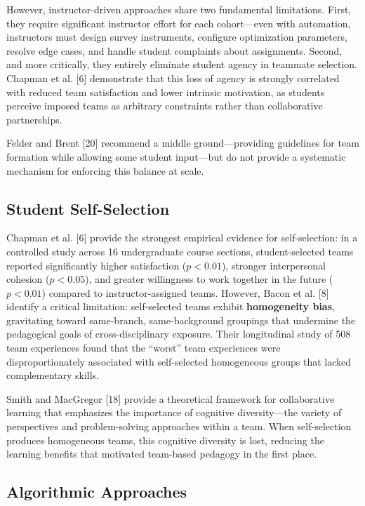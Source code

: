 \documentclass[12pt,a4paper]{article}
\begin{document}
However, instructor-driven approaches share two fundamental limitations. First, they require significant instructor effort for each cohort---even with automation, instructors must design survey instruments, configure optimization parameters, resolve edge cases, and handle student complaints about assignments. Second, and more critically, they entirely eliminate student agency in teammate selection. Chapman et al. [6] demonstrate that this loss of agency is strongly correlated with reduced team satisfaction and lower intrinsic motivation, as students perceive imposed teams as arbitrary constraints rather than collaborative partnerships.

Felder and Brent [20] recommend a middle ground---providing guidelines for team formation while allowing some student input---but do not provide a systematic mechanism for enforcing this balance at scale.

\subsection{Student Self-Selection}

Chapman et al. [6] provide the strongest empirical evidence for self-selection: in a controlled study across 16 undergraduate course sections, student-selected teams reported significantly higher satisfaction ($p < 0.01$), stronger interpersonal cohesion ($p < 0.05$), and greater willingness to work together in the future ($p < 0.01$) compared to instructor-assigned teams. However, Bacon et al. [8] identify a critical limitation: self-selected teams exhibit \textbf{homogeneity bias}, gravitating toward same-branch, same-background groupings that undermine the pedagogical goals of cross-disciplinary exposure. Their longitudinal study of 508 team experiences found that the ``worst'' team experiences were disproportionately associated with self-selected homogeneous groups that lacked complementary skills.

Smith and MacGregor [18] provide a theoretical framework for collaborative learning that emphasizes the importance of cognitive diversity---the variety of perspectives and problem-solving approaches within a team. When self-selection produces homogeneous teams, this cognitive diversity is lost, reducing the learning benefits that motivated team-based pedagogy in the first place.

\subsection{Algorithmic Approaches}
\end{document}
